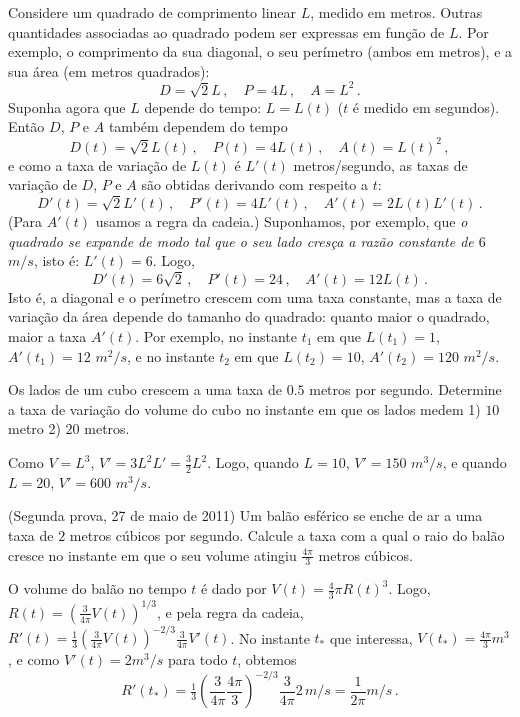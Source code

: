 \begin{ex}
Considere um quadrado de comprimento linear $L$, medido em
metros. Outras quantidades associadas ao 
quadrado podem ser expressas em função de $L$.
Por exemplo, o comprimento da sua diagonal, o seu perímetro (ambos em metros), e
a sua área (em metros quadrados):
$$D=\sqrt{2}L\,,\quad P=4L\,,\quad A=L^2\,.$$
Suponha agora que $L$ depende do tempo: $L=L(t)$ ($t$ é medido em segundos).
Então $D$, $P$ e $A$ também dependem do tempo
$$D(t)=\sqrt{2}L(t)\,,\quad P(t)=4L(t)\,,\quad A(t)=L(t)^2\,,$$ 
e como a taxa de variação de $L(t)$ é $L'(t)$ metros/segundo,
as taxas de variação
de $D$, $P$ e $A$ são obtidas derivando com respeito a $t$:
$$D'(t)=\sqrt{2} L'(t)\,,\quad P'(t)=4L'(t)\,,\quad
A'(t)=2L(t)L'(t)\,.$$
(Para $A'(t)$ usamos a regra da cadeia.)
Suponhamos, por exemplo, que \emph{o quadrado se expande de modo tal que o seu
lado cresça a razão constante de $6$ $m/s$}, isto é: $L'(t)=6$.
Logo, 
$$D'(t)=6\sqrt{2}\,,\quad P'(t)=24\,,\quad
A'(t)=12L(t)\,.$$
Isto é, a diagonal e o perímetro crescem com uma taxa constante, mas a taxa
de variação da área depende do tamanho do quadrado: quanto maior o quadrado,
maior a taxa $A'(t)$.
Por exemplo, no instante $t_ 1$ em que $L(t_1)=1$, $A'(t_1)=12$ $m^2/s$, e no
instante $t_2$ em que $L(t_2)=10$, $A'(t_2)=120$ $m^2/s$.
\end{ex}

\begin{exo}
Os lados de um cubo crescem a uma taxa de $0.5$ metros por segundo.
Determine a taxa de variação do volume do cubo no instante em que os lados
medem 1) $10$ metro 2) $20$ metros.
\begin{sol}
Como $V=L^3$, $V'=3L^2L'=\frac32 L^2$.
Logo, quando $L=10$, $V'=150$ $m^3/s$, e quando 
$L=20$, $V'=600$ $m^3/s$.
\end{sol}
\end{exo}

\begin{exo} (Segunda prova, 27 de maio de 2011)
Um balão esférico se enche de ar a uma taxa de $2$ metros
cúbicos por segundo.  Calcule
a taxa com a qual o raio do balão cresce no instante em que o seu volume 
atingiu $\frac{4\pi}{3}$ metros cúbicos.
\begin{sol}
O volume do balão no tempo $t$ é dado por $V(t)=\tfrac43 \pi R(t)^3$. 
Logo, $R(t)=(\frac{3}{4\pi}V(t))^{1/3}$, e pela regra da cadeia, 
$R'(t)=\tfrac13(\frac{3}{4\pi}V(t))^{-2/3}\frac{3}{4\pi}V'(t)$.
No instante $t_*$ que interessa, $V(t_*)=\frac{4\pi}{3}m^3$, e como
$V'(t)=2m^3/s$ para todo $t$, obtemos
$$
R'(t_*)=\tfrac13(\frac{3}{4\pi}\frac{4\pi}{3})^{-2/3}\frac{3}{4\pi}2\,m/s=\frac{
1}{2\pi}m/s\,.
$$
\end{sol}
\end{exo}

